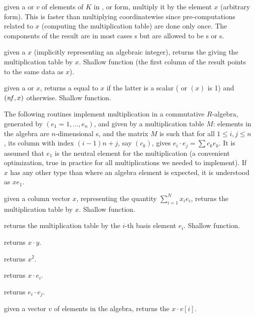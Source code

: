  given a  or 
$v$ of elements of $K$ in ,  or  form, multiply
it by the element $x$ (arbitrary form). This is faster than multiplying
coordinatewise since pre-computations related to $x$ (computing the
multiplication table) are done only once. The components of the result 
are in most cases s but are allowed to be s or s.

 given a  $x$ (implicitly
representing an algebraic integer), returns the  giving the
multiplication table by $x$. Shallow function (the first column of the result
points to the same data as $x$).

 given a  or 
$x$, returns a  equal to $x$ if the latter is a scalar
( or $(x)$ is 1) and
$(\hbox{\it nf\/},x)$ otherwise. Shallow function.


The following routines implement multiplication in a commutative $R$-algebra,
generated by $(e_1 = 1,\dots, e_n)$, and given by a multiplication table $M$:
elements in the algebra are $n$-dimensional s, and the matrix
$M$ is such that for all $1\leq i,j\leq n$, its column with index $(i-1)n +
j$, say $(c_k)$, gives $e_i\cdot e_j = \sum c_k e_k$. It is assumed that
$e_1$ is the neutral element for the multiplication (a convenient
optimization, true in practice for all multiplications we needed to implement).
If $x$ has any other type than  where an algebra element is
expected, it is understood as $x e_1$.

 given a column vector $x$, representing
the quantity $\sum_{i=1}^N x_i e_i$, returns the multiplication table by $x$.
Shallow function.

 returns the multiplication table
by the $i$-th basis element $e_i$. Shallow function.

 returns $x\cdot y$.

 returns $x^2$.

 returns $x\cdot e_i$.

 returns $e_i\cdot e_j$.

 given a vector $v$ of elements
in the algebra, returns the $x\cdot v[i]$.

